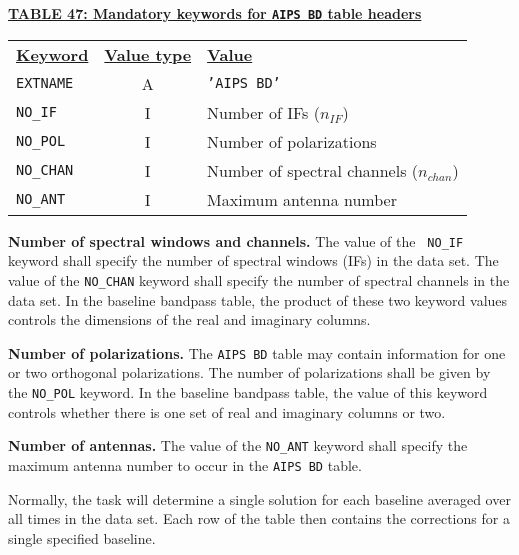 \documentclass[twoside]{article}
\newcommand{\nif}{$n_{IF}$}
\newcommand{\nchan}{$n_{chan}$}
\begin{document}
\begin{center}
\underline{\bf{TABLE 47: Mandatory keywords for {\tt AIPS BD} table
    headers}}\\
\begin{tabular}{lcl}
\noalign{\vspace{2pt}} \label{ta:BDkeys}
\underline{{\bf Keyword}} & \underline{\bf{Value type}} &
    \underline{\bf{Value\vphantom{y}}} \\
\noalign{\vspace{2pt}}
{\tt EXTNAME}   & A & {\tt 'AIPS BD'}  \\
{\tt NO\_IF}    & I & Number of IFs (\nif)\\
{\tt NO\_POL}   & I & Number of polarizations \\
{\tt NO\_CHAN}  & I & Number of spectral channels (\nchan) \\
{\tt NO\_ANT}   & I & Maximum antenna number
\end{tabular}
\end{center}

{\bf Number of spectral windows and channels.} The value of the {\tt
  NO\_IF} keyword shall specify the number of spectral windows (IFs)
in the data set.  The value of the {\tt NO\_CHAN} keyword shall
specify the number of spectral channels in the data set.  In the
baseline bandpass table, the product of these two keyword values
controls the  dimensions of the real and imaginary columns.

{\bf Number of polarizations.}  The {\tt AIPS BD} table may contain
information for one or two orthogonal polarizations.  The number of
polarizations shall be given by the {\tt NO\_POL} keyword.   In the
baseline bandpass table, the value of this keyword controls whether
there is one set of real and imaginary columns or two.

{\bf Number of antennas.} The value of the {\tt NO\_ANT} keyword shall
specify the maximum antenna number to occur in the {\tt AIPS BD} table.

Normally, the task will determine a single solution for each baseline
averaged over all times in the data set.  Each row of the table then
contains the corrections for a single specified baseline.
\end{document}
